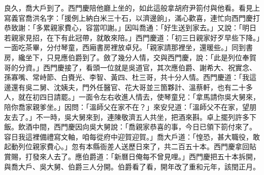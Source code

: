 良久，喬大戶到了。西門慶陪他廳上坐的，如此這般拿胡府尹箚付與他看。看見上寫義官喬洪名字：「援例上納白米三十石，以濟邊餉」，滿心歡喜，連忙向西門慶打恭致謝：「多累親家費心，容當叩謝。」{}因叫喬通：「好生送到家去。」又說：「明日若親家見招，在下有此冠帶，就敢來陪。」西門慶道：「初三日親家好歹早些下降。」一面吃茶畢，分付琴童，西廂書房裡放卓兒。「親家請那裡坐，還暖些。」同到書房，纔坐下，只見應伯爵到了。斂了幾分人情，交與西門慶，說：「此是列位奉賀哥的分資。」西門慶接了，看頭一位就是吳道官，其次應伯爵、謝希大、祝實念、孫寡嘴、常峙節、白賚光、李智、黃四、杜三哥，共十分人情。西門慶道：「我這邊還有吳二舅、沈姨夫，門外任醫官、花大哥並三箇夥計、溫蔡軒，也有二十多人，就在初四日請罷。」一面令左右收進人情去，使琴童兒：「拿馬請你吳大舅來，陪你喬家親爹坐。」因問：「溫師父在家不在？」來安兒道：「溫師父不在家，望朋友去了。」不一時，吳大舅來到，連陳敬濟五人共坐，把酒來斟。卓上擺列許多下飯。飲酒中間，西門慶因向吳大舅說：「喬親家恭喜的事，今日已領下箚付來了。容日我這裡備禮寫文軸，咱每從府中迎賀迎賀。」喬大戶道：「惶恐，甚大職役，敢起動列位親家費心。」忽有本縣衙差人送歷日來了，共二百五十本。西門慶拿回貼賞賜，打發來人去了。應伯爵道：「新曆日俺每不曾見哩。」西門慶把五十本拆開，與喬大戶、吳大舅、伯爵三人分開。伯爵看了看，開年改了重和元年，該閏正月。

